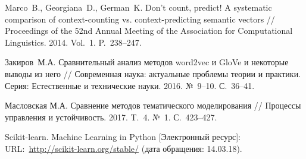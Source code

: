 \documentclass[12pt]{article}
\begin{document}
\begin{thebibliography}{99}
   Marco~B., Georgiana~D., German~K. Don’t count, predict! A systematic comparison of context-counting vs. context-predicting semantic vectors //  Proceedings of the 52nd Annual Meeting of the Association for Computational Linguistics. 2014. Vol.~1. P.~238--247.

  Закиров~М.\:А. Сравнительный анализ методов word2vec и GloVe и некоторые выводы из него // Современная наука: актуальные проблемы теории и практики. Серия: Естественные и технические науки. 2016. №~9--10. С.~36--41.

 Масловская М.\:А. Сравнение методов тематического моделирования // Процессы управления и устойчивость. 2017. T.~4. №~1. С.~423--427.

  Scikit-learn. Machine Learning in Python [Электронный ресурс]: URL:~\url{http://scikit-learn.org/stable/} (дата обращения: 14.03.18).

\end{thebibliography}
\end{document}
